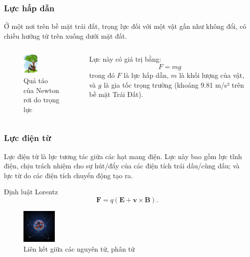 \begin{frame}
    \frametitle{Lực hấp dẫn}
    Ở một nơi trên bề mặt trái đất, trọng lực đối với một vật gần như không đổi, có chiều hướng từ trên xuống dưới mặt đất.
    \begin{columns}
    \begin{column}{0.5\textwidth}
        \begin{figure}
        \centering
        \includegraphics[width=0.4\textwidth,keepaspectratio]{Slides/Figure/applefalling.jpg}
        \caption{Quả táo của Newton rơi do trọng lực}
        \end{figure}
    \end{column}
    \begin{column}{0.5\textwidth}
        Lực này có giá trị bằng:
        \begin{equation}
            F=mg
        \end{equation}
        trong đó \(F\) là lực hấp dẫn, \(m\) là khối lượng của vật, và \(g\) là gia tốc trọng trường (khoảng 9.81 m/s² trên bề mặt Trái Đất).
    \end{column}
    \end{columns}
\end{frame}

\begin{frame}
\frametitle{Lực điện từ}
\begin{tcolorbox}[colback=blue!10, colframe=blue!50!black]
Lực điện từ là lực tương tác giữa các hạt mang điện. Lực này bao gồm lực tĩnh điện, chịu trách nhiệm cho sự hút/đẩy của các điện tích trái dấu/cùng dấu; và lực từ do các điện tích chuyển động tạo ra.
\end{tcolorbox}
Định luật Lorentz \[\mathbf{F}=q(\mathbf{E}+\mathbf{v}\times\mathbf{B}).\]
\begin{figure}
\centering
\includegraphics[width=0.15\textwidth]{Slides/Figure/atom.jpg}
\caption{Liên kết giữa các nguyên tử, phân tử}
\end{figure}
\end{frame}

